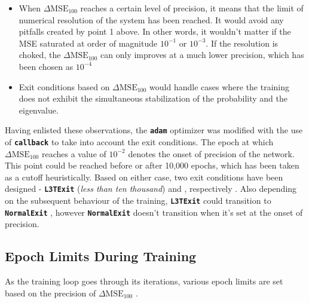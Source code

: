 \documentclass{article}
\newcommand{\dmse}{$\displaystyle{\Delta \text{MSE}_{100}}$ }
\newcommand{\oom}[1]{$10^{#1}$}
\newcommand{\adam}{\texttt{\textbf{adam}} }
\newcommand{\callback}{\texttt{\textbf{callback}} }
\newcommand{\lTTTExit}{\texttt{\textbf{L3TExit}} }
\newcommand{\normalExit}{\texttt{\textbf{NormalExit}} }
\begin{document}
\begin{enumerate}
\begin{itemize}
        \item When \dmse reaches a certain level of precision, it means that the limit of numerical resolution of the system has been reached. It would avoid any pitfalls created by point 1 above. In other words, it wouldn't matter if the MSE saturated at order of magnitude \oom{-1} or \oom{-3}. If the resolution is choked, the \dmse can only improves at a much lower precision, which has been chosen as \oom{-4}
        \item Exit conditions based on \dmse would handle cases where the training does not exhibit the simultaneous stabilization of the probability and the eigenvalue.
    \end{itemize}
\end{enumerate}

\justify
Having enlisted these observations, the \adam optimizer was modified with the use of \callback to take into account the exit conditions. The epoch at which \dmse reaches a value of \oom{-2} denotes the onset of precision of the network. This point could be reached before or after 10,000 epochs, which has been taken as a cutoff heuristically. Based on either case, two exit conditions have been designed - \lTTTExit (\textit{less than ten thousand}) and \normalExi, respectively . Also depending on the subsequent behaviour of the training, \lTTTExit could transition to \normalExit, however \normalExit doesn't transition when it's set at the onset of precision.

\subsection{Epoch Limits During Training}

\justify
As the training loop goes through its iterations, various epoch limits are set based on the precision of \dmse. \\
\end{document}
